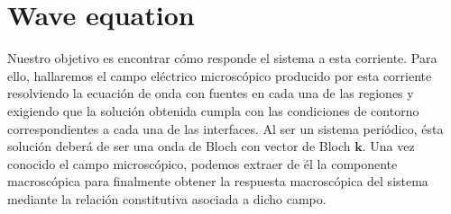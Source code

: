 \documentclass{iopart}
\begin{document}
\section{Wave equation}
Nuestro objetivo es encontrar cómo responde el sistema a esta
corriente. Para ello, hallaremos el campo eléctrico microscópico
producido por esta corriente resolviendo la ecuación de onda con
fuentes en cada una de las regiones y exigiendo que la solución
obtenida cumpla con las condiciones de contorno correspondientes a
cada una de las interfaces. Al ser un sistema periódico, ésta solución
deberá de ser una onda de Bloch con vector de Bloch $\mathbf k$. Una
vez conocido el campo microscópico, podemos extraer de él la
componente macroscópica para finalmente obtener la respuesta
macroscópica del sistema mediante la relación constitutiva asociada a
dicho campo.
\end{document}
